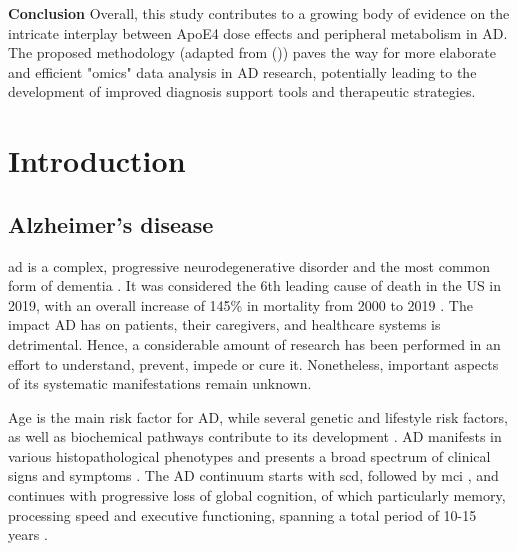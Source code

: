 \documentclass{amsart}
\newcommand{\mainmatter}{
    \newpage
    \pagenumbering{arabic}  %
}
\begin{document}
\textbf{Conclusion}\hspace{.1cm} Overall, this study contributes to a growing body of evidence on the intricate interplay between ApoE4 dose effects and peripheral metabolism in AD. The proposed methodology (adapted from \citeauthor{deLeeuw2017Blood-basedDisease} (\citeyear{deLeeuw2017Blood-basedDisease})) paves the way for more elaborate and efficient "omics" data analysis in AD research, potentially leading to the development of improved diagnosis support tools and therapeutic strategies. 


\clearpage
\printacronyms[title = Abbreviations, toctitle = ABBREVIATIONS]

\newpage
\tableofcontents

\mainmatter

\newpage
\section{Introduction}\label{Intro}
\subsection{Alzheimer’s disease}
\acrfull{ad} is a complex, progressive neurodegenerative disorder and the most common form of dementia \cite{Penke2023NewDisease}. It was considered the 6th leading cause of death in the US in 2019, with an overall increase of 145\% in mortality from 2000 to 2019 \cite{20232023Figures}. The impact AD has on patients, their caregivers, and healthcare systems is detrimental. Hence, a considerable amount of research has been performed in an effort to understand, prevent, impede or cure it. Nonetheless, important aspects of its systematic manifestations remain unknown.

Age is the main risk factor for AD, while several genetic and lifestyle risk factors, as well as biochemical pathways contribute to its development \cite{Penke2023NewDisease}. AD manifests in various histopathological phenotypes and presents a broad spectrum of clinical signs and symptoms \cite{Heneka2015NeuroinflammationDisease, Edwards2019ANeurodegeneration}. The AD continuum starts with \acrfull{scd}, followed by \acrfull{mci} \cite*{AALDIJK2022101556}, and continues with progressive loss of global cognition, of which particularly memory, processing speed and executive functioning, spanning a total period of 10-15 years \cite{Scheltens2016AlzheimersDisease}. 
\end{document}
